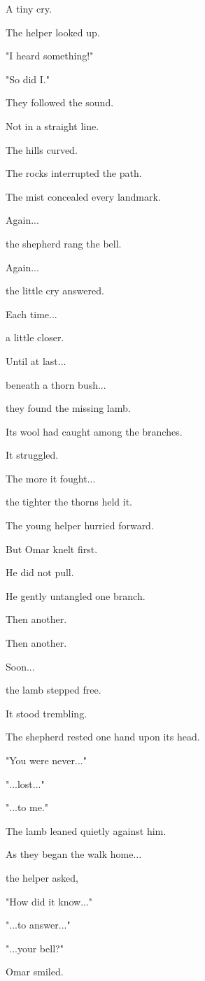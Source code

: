 \documentclass[12pt,openany]{book}
\begin{document}
A tiny cry.

The helper looked up.

"I heard something!"

"So did I."

They followed the sound.

Not in a straight line.

The hills curved.

The rocks interrupted the path.

The mist concealed every landmark.

Again...

the shepherd rang the bell.

Again...

the little cry answered.

Each time...

a little closer.

Until at last...

beneath a thorn bush...

they found the missing lamb.

Its wool had caught among the branches.

It struggled.

The more it fought...

the tighter the thorns held it.

The young helper hurried forward.

But Omar knelt first.

He did not pull.

He gently untangled one branch.

Then another.

Then another.

Soon...

the lamb stepped free.

It stood trembling.

The shepherd rested one hand upon its head.

"You were never..."

"...lost..."

"...to me."

The lamb leaned quietly against him.

As they began the walk home...

the helper asked,

"How did it know..."

"...to answer..."

"...your bell?"

Omar smiled.
\end{document}
